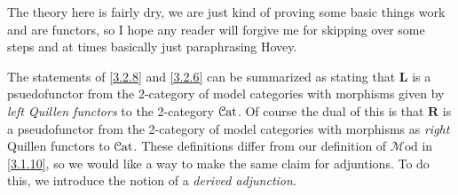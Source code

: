 \begin{remark}\label{3.2.9}
	The theory here is fairly dry, we are just kind of proving some basic things work and are functors, so I hope any reader will forgive me for skipping over some steps and at times basically just paraphrasing Hovey.
\end{remark}

\begin{remark}\label{3.2.10}
	The statements of \cref{3.2.8} and \cref{3.2.6} can be summarized as stating that $\mathbf{L} $ is a psuedofunctor from the 2-category of model categories with morphisms given by \emph{left Quillen functors} to the 2-category $\mathcal{C}\mathrm{at} $. Of course the dual of this is that $\mathbf{R} $ is a pseudofunctor from the 2-category of model categories with morphisms as \emph{right} Quillen functors to $\mathcal{C}\mathrm{at} $. These definitions differ from our definition of $\mathcal{M} \mathrm{od} $ in \cref{3.1.10}, so we would like a way to make the same claim for adjuntions. To do this, we introduce the notion of a \emph{derived adjunction}.
\end{remark}

